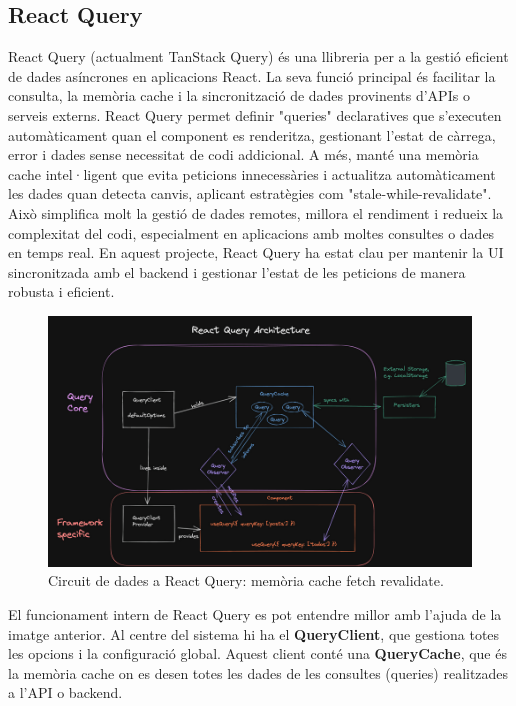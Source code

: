 \subsection*{React Query}
React Query (actualment TanStack Query) és una llibreria per a la gestió eficient de dades asíncrones en aplicacions React. La seva funció principal és facilitar la consulta, la memòria cache i la sincronització de dades provinents d'APIs o serveis externs. React Query permet definir "queries" declaratives que s'executen automàticament quan el component es renderitza, gestionant l'estat de càrrega, error i dades sense necessitat de codi addicional. A més, manté una memòria cache intel·ligent que evita peticions innecessàries i actualitza automàticament les dades quan detecta canvis, aplicant estratègies com "stale-while-revalidate". Això simplifica molt la gestió de dades remotes, millora el rendiment i redueix la complexitat del codi, especialment en aplicacions amb moltes consultes o dades en temps real. En aquest projecte, React Query ha estat clau per mantenir la UI sincronitzada amb el backend i gestionar l'estat de les peticions de manera robusta i eficient.
\begin{figure}[H]
\centering
\includegraphics[width=0.9\linewidth]{Figures/architecture.png}
\caption{Circuit de dades a React Query: memòria cache \textrightarrow{} fetch \textrightarrow{} revalidate.}
\label{fig:react-query}
\end{figure}

El funcionament intern de React Query es pot entendre millor amb l'ajuda de la imatge anterior. Al centre del sistema hi ha el \textbf{QueryClient}, que gestiona totes les opcions i la configuració global. Aquest client conté una \textbf{QueryCache}, que és la memòria cache on es desen totes les dades de les consultes (queries) realitzades a l'API o backend.

